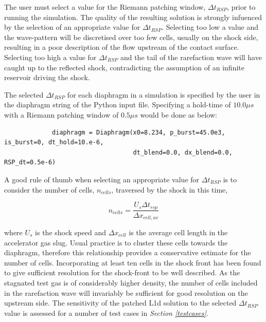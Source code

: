 \documentclass[a4paper,10pt]{article}
\begin{document}
The user must select a value for the Riemann patching window, $ \Delta t_{RSP} $, prior to running the simulation.  The quality of the resulting solution is strongly infuenced by the selection of an appropriate value for $ \Delta t_{RSP} $.  Selecting too low a value and the wave-pattern will be discretised over too few cells, usually on the shock side, resulting in a poor description of the flow upstream of the contact surface.  Selecting too high a value for $ \Delta t_{RSP} $ and the tail of the rarefaction wave will have caught up to the reflected shock, contradicting the assumption of an infinite reservoir driving the shock.

\par \medskip

The selected $ \Delta t_{RSP} $ for each diaphragm in a simulation is specified by the user in the diaphragm string of the Python input file.  Specifying a hold-time of $ 10.0 \mu s$ with a Riemann patching window of $ 0.5 \mu s$ would be done as below:

\par \medskip

\begin{small}
\begin{verbatim}
             diaphragm = Diaphragm(x0=8.234, p_burst=45.0e3, is_burst=0, dt_hold=10.e-6,
                                   dt_blend=0.0, dx_blend=0.0, RSP_dt=0.5e-6)
\end{verbatim}
\end{small}

\par \medskip

A good rule of thumb when selecting an appropriate value for $ \Delta t_{RSP} $ is to consider the number of cells, $n_{cells}$, traversed by the shock in this time,

\begin{equation}
n_{cells} = \frac{U_{s} \Delta t_{rsp}}{\Delta x_{cell, av}} \label{eq:rsp_dt}
\end{equation}

where $U_{s}$ is the shock speed and $\Delta x_{cell}$ is the average cell length in the accelerator gas slug.  Usual practice is to cluster these cells towards the diaphragm, therefore this relationship provides a conservative estimate for the number of cells.  Incorporating at least ten cells in the shock front has been found to give sufficient resolution for the shock-front to be well described.  As the stagnated test gas is of considerably higher density, the number of cells included in the rarefaction wave will invariably be sufficient for good resolution on the upstream side.  The sensitivity of the patched L1d solution to the selected $ \Delta t_{RSP} $ value is assessed for a number of test cases in \emph{Section \ref{testcases}}.
\end{document}
